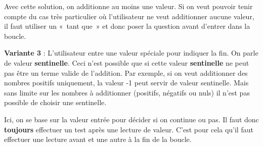 		
		Avec cette solution, on additionne au moins une valeur. 
		Si on veut pouvoir tenir compte du
		cas très particulier où l'utilisateur ne veut
		additionner aucune valeur, il faut utiliser un «~tant que~» et donc
		poser la question avant d'entrer dans la boucle.


		\textbf{Variante 3} :
		L'utilisateur entre une valeur spéciale pour indiquer la fin. 
		On parle de valeur \textbf{sentinelle}. 
		Ceci n'est possible que si cette valeur \textbf{sentinelle} ne peut pas être
		un terme valide de l'addition. Par exemple, si on veut
		additionner des nombres positifs uniquement, la valeur -1 peut servir
		de valeur sentinelle. Mais sans limite sur les nombres à additionner
		(positifs, négatifs ou nuls) il n'est pas possible de
		choisir une sentinelle.

		Ici, on se base sur la valeur entrée pour décider si on continue ou pas. 
		Il faut donc \textbf{toujours} effectuer un test
		après une lecture de valeur. C'est pour cela
		qu'il faut effectuer une lecture avant et une autre à
		la fin de la boucle.


